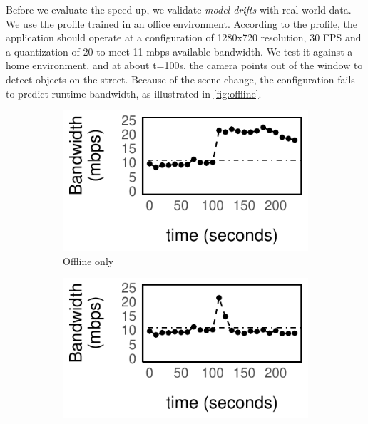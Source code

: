 Before we evaluate the speed up, we validate \textit{model drifts} with
real-world data. We use the profile trained in an office environment.  According
to the profile, the application should operate at a configuration of 1280x720
resolution, 30 FPS and a quantization of 20 to meet 11 mbps available bandwidth.
We test it against a home environment, and at about t=100s, the camera points
out of the window to detect objects on the street. Because of the scene change,
the configuration fails to predict runtime bandwidth, as illustrated in
\autoref{fig:offline}.

\begin{figure}
  \centering
  \begin{subfigure}[t]{0.48\columnwidth}
    \centering
    \includegraphics[width=\textwidth]{figures/online1.pdf}
    \caption{Offline only}
    \label{fig:offline}
  \end{subfigure}
  \hfill
  \begin{subfigure}[t]{0.48\columnwidth}
    \centering
    \includegraphics[width=\textwidth]{figures/online2.pdf}

\end{subfigure}
\end{figure}
